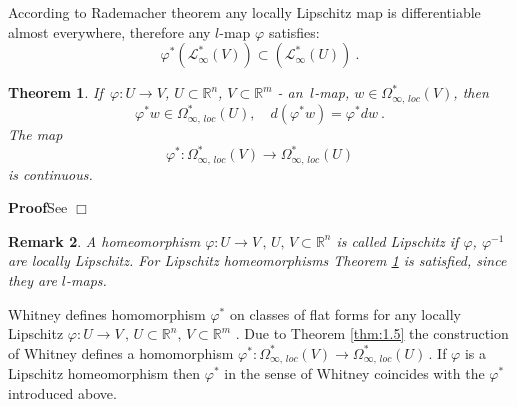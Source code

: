 \documentclass{amsart}%
\newtheorem{thm}{Theorem}[section]
\newtheorem{rem}[thm]{Remark}
\newcommand{\Rn}{\mathbb{R}^{n}}
\begin{document}
According to Rademacher theorem \cite[IX.11]{W} any locally
Lipschitz map is differentiable almost everywhere, therefore any
$l$-map $\varphi$ satisfies:
$$\varphi^*(\mathcal{L}^{*}_\infty(V))\subset
(\mathcal{L}^{*}_\infty(U))\ .$$
\begin{thm}
\label{thm:2.2} If $\,\varphi: U\rightarrow V$, $U\subset \Rn$,
$V\subset \mathbb{R}^{m}$ - an $\,l$-map, $w\in
\Omega^{*}_{\infty,\,loc}(V)$, then $$\varphi^* w\in
\Omega^{*}_{\infty,\,loc}(U) ,\quad d(\varphi^* w)= \varphi^* dw\
.$$ The map
$$\varphi^*: \Omega^{*}_{\infty,\,loc}(V) \rightarrow \Omega^{*}_{\infty,\,loc}(U)$$
is continuous.
\end{thm}
{\bf Proof}\quad See \cite[Theorem 2.2]{GKS} $\Box$
\begin{rem}
A homeomorphism $\varphi: U \rightarrow V\,,\,U,\,V \subset \Rn $
is called Lipschitz if $\varphi$, $\varphi^{-1}$ are locally
Lipschitz. For Lipschitz homeomorphisms Theorem \ref{thm:2.2} is
satisfied, since they are $l$-maps.\end{rem} Whitney defines
homomorphism $\varphi^*$ on classes of flat forms for any locally
Lipschitz $\varphi: U \rightarrow V\,,\,U\subset \Rn,\,V  \subset
\mathbb{R}^{m}$ \cite[X.9]{W} . Due to Theorem \ref{thm:1.5} the
construction of Whitney defines a homomorphism $\varphi^*:
\Omega^{*}_{\infty,\,loc}(V) \rightarrow
\Omega^{*}_{\infty,\,loc}(U)\,$. If $\varphi$ is a Lipschitz
homeomorphism then $\varphi^*$ in the sense of Whitney
\cite[X.9]{W} coincides with the $\varphi^*$ introduced above.
\end{document}
